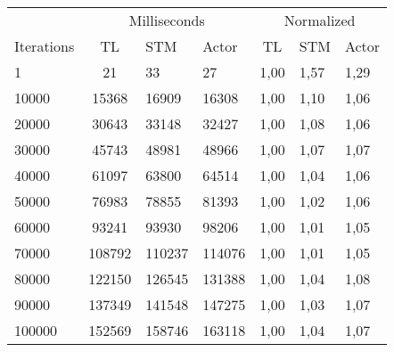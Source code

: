 \begin{center}
\begin{table}[h]
\centering
\begin{tabular}{l|cll|cll}
             & \multicolumn{3}{c|}{Milliseconds} & \multicolumn{3}{c}{Normalized} \\
Iterations & TL     & STM     & Actor     & TL      & STM      & Actor     \\ \hline
1  			&		21			&      33			&		27      & 1,00  & 1,57  &   1,29    \\
10000		&       15368		&      16909		&		16308   & 1,00  & 1,10  &   1,06    \\
20000		&       30643		&      33148		&		32427   & 1,00  & 1,08  &   1,06    \\
30000		&		45743		&      48981		&		48966   & 1,00  & 1,07  &   1,07    \\
40000		&		61097		&      63800		&		64514   & 1,00  & 1,04  &   1,06    \\
50000		&		76983		&      78855    	&		81393   & 1,00  & 1,02  &   1,06    \\
60000		&       93241		&      93930		&		98206   & 1,00  & 1,01  &   1,05    \\
70000		&       108792		&      110237   	&		114076  & 1,00  & 1,01  &   1,05    \\
80000		&		122150		&      126545	    &		131388  & 1,00  & 1,04  &   1,08    \\
90000		&		137349		&      141548   	&		147275  & 1,00  & 1,03  &   1,07    \\
100000	    &		152569		&      158746	    &		163118  & 1,00  & 1,04  &   1,07    \\
\end{tabular}
\end{table}
\label{table:test_results_iterations}
\end{center}

